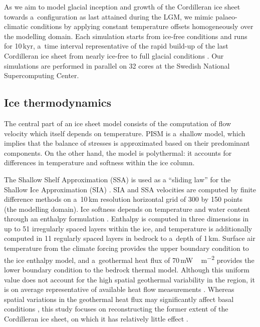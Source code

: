 \documentclass[tc, ms]{copernicus}
\begin{document}
As we aim to model glacial inception and growth of the Cordilleran ice sheet towards a~configuration as last attained during the LGM, we mimic palaeo-climatic conditions by applying constant temperature offsets homogeneously over the modelling domain. Each simulation starts from ice-free conditions and runs for 10\,kyr, a~time interval representative of the rapid build-up of the last Cordilleran ice sheet from nearly ice-free to full glacial conditions \citep{clague-1989,stroeven-etal-2010}. Our simulations are performed in parallel on 32 cores at the Swedish National Supercomputing Center.

\subsection{Ice thermodynamics}

The central part of an ice sheet model consists of the computation of flow velocity which itself depends on temperature. PISM is a~shallow model, which implies that the balance of stresses is approximated based on their predominant components. On the other hand, the model is polythermal: it accounts for differences in temperature and softness within the ice column.

The Shallow Shelf Approximation (SSA) is used as a ``sliding law'' for the Shallow Ice Approximation (SIA) \citep{bueler-brown-2009,winkelmann-etal-2011}. SIA and SSA velocities are computed by finite difference methods on a~10\,km resolution horizontal grid of 300 by 150 points (the modelling domain). Ice softness depends on temperature and water content through an enthalpy formulation \citep{aschwanden-blatter-2009,aschwanden-etal-2012}. Enthalpy is computed in three dimensions in up to 51 irregularly spaced layers within the ice, and temperature is additionally computed in 11 regularly spaced layers in bedrock to a~depth of 1\,km. Surface air temperature from the climate forcing provides the upper boundary condition to the ice enthalpy model, and a~geothermal heat flux of 70\,\unit{mW\,m^{-2}} provides the lower boundary condition to the bedrock thermal model. Although this uniform value does not account for the high spatial geothermal variability in the region, it is on average representative of available heat flow measurements \citep{artemieva-mooney-2001,blackwell-richards-2004}. Whereas spatial variations in the geothermal heat flux may significantly affect basal conditions \citep{pattyn-2010}, this study focuses on reconstructing the former extent of the Cordilleran ice sheet, on which it has relatively little effect \citep{rogozhina-etal-2012}.
\end{document}
